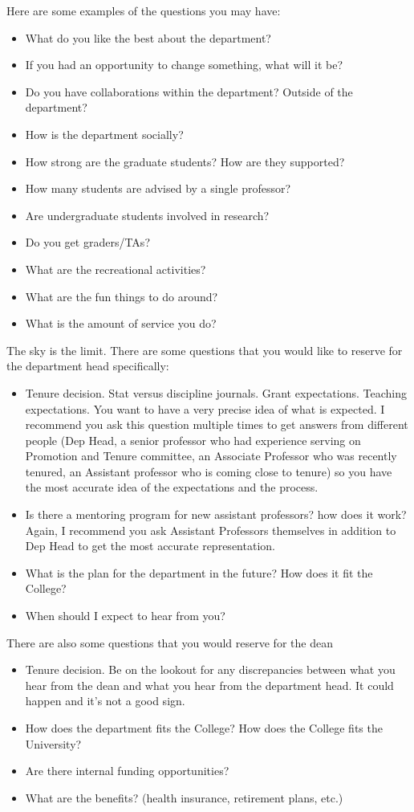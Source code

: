 \documentclass{article}
\begin{document}
Here are some examples of the questions you may have:
\begin{itemize}
\item What do you like the best about the department?
\item If you had an opportunity to change something, what will it be?
\item Do you have collaborations within the department? Outside of the department?
\item How is the department socially?
\item How strong are the graduate students? How are they supported?
\item How many students are advised by a single professor?
\item Are undergraduate students involved in research?
\item Do you get graders/TAs?
\item What are the recreational activities?
\item What are the fun things to do around?
\item What is the amount of service you do?
\end{itemize}
The sky is the limit. There are some questions that you would like to reserve for the department head specifically:
\begin{itemize}
\item Tenure decision. Stat versus discipline journals. Grant expectations. Teaching expectations. You want to have a very precise idea of what is expected. {\color{red} I recommend you ask this question multiple times to get answers from different people (Dep Head, a senior professor who had experience serving on Promotion and Tenure committee, an Associate Professor who was recently tenured, an Assistant professor who is coming close to tenure) so you have the most accurate idea of the expectations and the process.}
\item Is there a mentoring program for new assistant professors? how does it work? {\color{red} Again, I recommend you ask Assistant Professors themselves in addition to Dep Head to get the most accurate representation.}
\item What is the plan for the department in the future? How does it fit the College?
\item When should I expect to hear from you?
\end{itemize}
There are also some questions that you would reserve for the dean
\begin{itemize}
\item Tenure decision. Be on the lookout for any discrepancies between what you hear from the dean and what you hear from the department head. It could happen and it's not a good sign.
\item How does the department fits the College? How does the College fits the University?
\item Are there internal funding opportunities?
\item What are the benefits? (health insurance, retirement plans, etc.)
\end{itemize}
\end{document}

